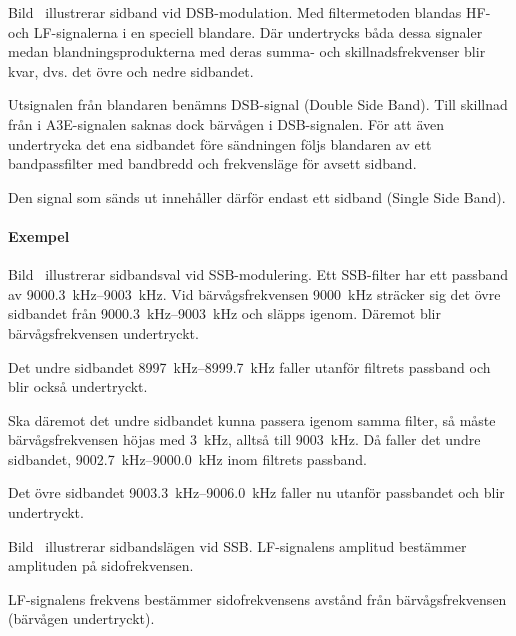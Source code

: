 Bild~ illustrerar sidband vid DSB-modulation.
Med filtermetoden blandas HF- och LF-signalerna i en speciell blandare.
Där undertrycks båda dessa signaler medan blandningsprodukterna med deras summa-
och skillnadsfrekvenser blir kvar, dvs. det övre och nedre sidbandet.

Utsignalen från blandaren benämns DSB-signal (Double Side Band).
Till skillnad från i A3E-signalen saknas dock bärvågen i DSB-signalen.
För att även undertrycka det ena sidbandet före sändningen följs blandaren
av ett bandpassfilter med bandbredd och frekvensläge för avsett sidband.

Den signal som sänds ut innehåller därför endast ett sidband (Single Side Band).

\newpage

\paragraph{Exempel}


Bild~ illustrerar sidbandsval vid SSB-modulering.
Ett SSB-filter har ett passband av \SIrange{9000,3}{9003}{\kilo\hertz}.
Vid bärvågsfrekvensen \qty{9000}{\kilo\hertz} sträcker sig det övre sidbandet
från \SIrange{9000,3}{9003}{\kilo\hertz} och släpps igenom.
Däremot blir bärvågsfrekvensen undertryckt.

Det undre sidbandet \SIrange{8997}{8999,7}{\kilo\hertz} faller utanför filtrets
passband och blir också undertryckt.

Ska däremot det undre sidbandet kunna passera igenom samma filter, så måste
bärvågsfrekvensen höjas med \qty{3}{\kilo\hertz}, alltså till
\qty{9003}{\kilo\hertz}.
Då faller det undre sidbandet, \SIrange{9002,7}{9000,0}{\kilo\hertz} inom
filtrets passband.

Det övre sidbandet \SIrange{9003,3}{9006,0}{\kilo\hertz} faller nu utanför
passbandet och blir undertryckt.


Bild~ illustrerar sidbandslägen vid SSB.
LF-signalens amplitud bestämmer amplituden på sidofrekvensen.

LF-signalens frekvens bestämmer sidofrekvensens avstånd från bärvågsfrekvensen
(bärvågen undertryckt).

